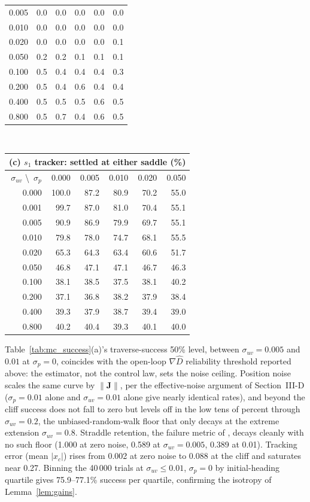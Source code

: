\documentclass[lettersize,journal]{IEEEtran}
\begin{document}
\begin{table}[!t]
\begin{tabular}{r|rrrrr}
0.005 &   0.0 &  0.0 &  0.0 &  0.0 &  0.0 \\
0.010 &   0.0 &  0.0 &  0.0 &  0.0 &  0.0 \\
0.020 &   0.0 &  0.0 &  0.0 &  0.0 &  0.1 \\
0.050 &   0.2 &  0.2 &  0.1 &  0.1 &  0.1 \\
0.100 &   0.5 &  0.4 &  0.4 &  0.4 &  0.3 \\
0.200 &   0.5 &  0.4 &  0.6 &  0.4 &  0.4 \\
0.400 &   0.5 &  0.5 &  0.5 &  0.6 &  0.5 \\
0.800 &   0.5 &  0.7 &  0.4 &  0.6 &  0.5 \\
\hline
\end{tabular}
\\[4pt]
\begin{tabular}{r|rrrrr}
\multicolumn{6}{l}{(c) $s_1$ tracker: settled at either saddle (\%)} \\
\hline
$\sigma_{uv}$ \textbackslash\ $\sigma_p$ & 0.000 & 0.005 & 0.010 & 0.020 & 0.050 \\
\hline
0.000 & 100.0 & 87.2 & 80.9 & 70.2 & 55.0 \\
0.001 &  99.7 & 87.0 & 81.0 & 70.4 & 55.1 \\
0.005 &  90.9 & 86.9 & 79.9 & 69.7 & 55.1 \\
0.010 &  79.8 & 78.0 & 74.7 & 68.1 & 55.5 \\
0.020 &  65.3 & 64.3 & 63.4 & 60.6 & 51.7 \\
0.050 &  46.8 & 47.1 & 47.1 & 46.7 & 46.3 \\
0.100 &  38.1 & 38.5 & 37.5 & 38.1 & 40.2 \\
0.200 &  37.1 & 36.8 & 38.2 & 37.9 & 38.4 \\
0.400 &  39.3 & 37.9 & 38.7 & 39.4 & 39.0 \\
0.800 &  40.2 & 40.4 & 39.3 & 40.1 & 40.0 \\
\hline
\end{tabular}
\end{table}

Table~\ref{tab:mc_success}(a)'s traverse-success 50\% level, between
$\sigma_{uv} = 0.005$ and $0.01$ at $\sigma_p = 0$, coincides with the
open-loop $\nabla\hat{D}$ reliability threshold reported above: the
estimator, not the control law, sets the noise ceiling. Position noise
scales the same curve by $\|\mathbf{J}\|$, per the effective-noise
argument of Section~\mbox{III-D} ($\sigma_p = 0.01$ alone and
$\sigma_{uv} = 0.01$ alone give nearly identical rates), and beyond the
cliff success does not fall to zero but levels off in the low tens of
percent through $\sigma_{uv} = 0.2$, the unbiased-random-walk floor
that only decays at the extreme extension $\sigma_{uv} = 0.8$.
Straddle retention, the failure metric of \cite{9}, decays cleanly with
no such floor (1.000 at zero noise, 0.589 at $\sigma_{uv} = 0.005$,
0.389 at 0.01). Tracking error (mean $|x_c|$) rises from 0.002 at
zero noise to 0.088 at the cliff and saturates near 0.27. Binning
the 40\,000 trials at $\sigma_{uv} \leq 0.01$, $\sigma_p = 0$ by
initial-heading quartile gives 75.9--77.1\% success per quartile,
confirming the isotropy of Lemma~\ref{lem:gains}.
\end{document}
